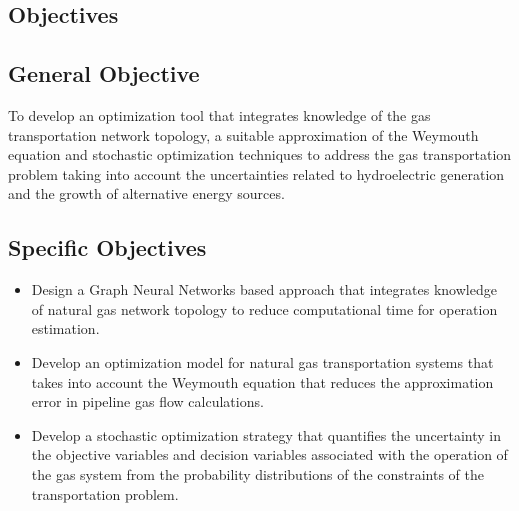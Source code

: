 \subsection{Objectives}

\subsection{General Objective}
To develop an optimization tool that integrates knowledge of the gas transportation network topology, a suitable approximation of the Weymouth equation and stochastic optimization techniques to address the gas transportation problem taking into account the uncertainties related to hydroelectric generation and the growth of alternative energy sources.

\subsection{Specific Objectives}
\begin{itemize}

\item Design a Graph Neural Networks based approach that integrates knowledge of natural gas network topology to reduce computational time for operation estimation.

\item Develop an optimization model for natural gas transportation systems that takes into account the Weymouth equation that reduces the approximation error in pipeline gas flow calculations.

\item Develop a stochastic optimization strategy that quantifies the uncertainty in the objective variables and decision variables associated with the operation of the gas system from the probability distributions of the constraints of the transportation problem.

\end{itemize}












